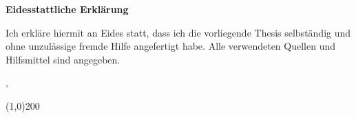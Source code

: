 \thispagestyle{plain}

{\parindent0pt

    \Large
    \textbf{Eidesstattliche Erklärung}

    \vspace{1cm}

    \normalsize
    Ich erkläre hiermit an Eides statt, dass ich die vorliegende Thesis selbständig und ohne
    unzulässige fremde Hilfe angefertigt habe. Alle verwendeten Quellen und Hilfsmittel sind
    angegeben.

    \vspace{1cm} \par
    \docCity, \docDeadline \par
    \vspace{1cm}
    \line(1,0){200} \par
    \docAuthor

}
